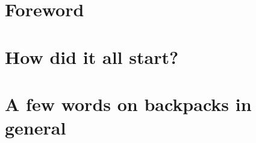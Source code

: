 \section{Foreword}


\section{How did it all start?}


\section{A few words on backpacks in general}

